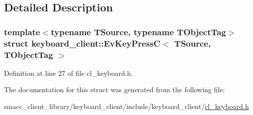\subsection{Detailed Description}
\subsubsection*{template$<$typename T\+Source, typename T\+Object\+Tag$>$\newline
struct keyboard\+\_\+client\+::\+Ev\+Key\+Press\+C$<$ T\+Source, T\+Object\+Tag $>$}



Definition at line 27 of file cl\+\_\+keyboard.\+h.



The documentation for this struct was generated from the following file\+:\begin{DoxyCompactItemize}
\item 
smacc\+\_\+client\+\_\+library/keyboard\+\_\+client/include/keyboard\+\_\+client/\hyperlink{cl__keyboard_8h}{cl\+\_\+keyboard.\+h}\end{DoxyCompactItemize}
